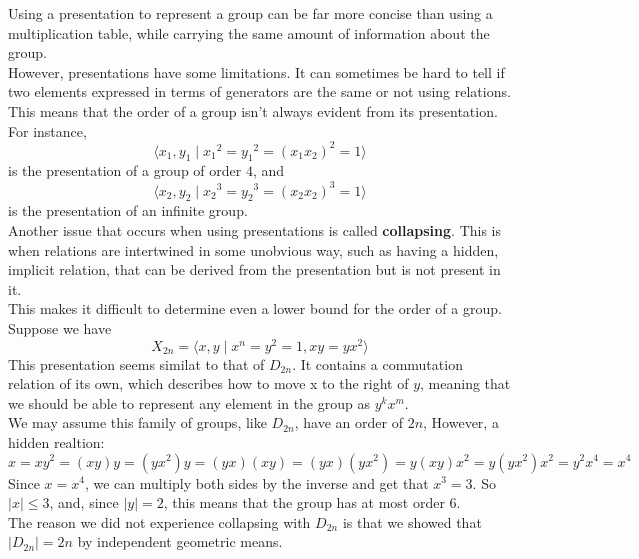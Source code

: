 \documentclass[12pt]{article}
\begin{document}
    Using a presentation to represent a group can be far more
    concise than using a multiplication table,
    while carrying the same amount of information about the group. \\
    However, presentations have some limitations.
    It can sometimes be hard to tell if two elements expressed
    in terms of generators are the same or not using relations.
    This means that the order of a group isn't always evident
    from its presentation.
    For instance,
    \[ \langle x_1, y_1 \mid {x_1}^2 = {y_1}^2 = (x_1x_2)^2 = 1 \rangle \]
    is the presentation of a group of order $4$,
    and
    \[ \langle x_2, y_2 \mid {x_2}^3 = {y_2}^3 = (x_2x_2)^3 = 1 \rangle \]
    is the presentation of an infinite group. \\
    
    Another issue that occurs when using presentations 
    is called \textbf{collapsing}.
    This is when relations are intertwined in some unobvious way,
    such as having a hidden, implicit relation,
    that can be derived from the presentation but is not present in it. \\
    This makes it difficult to determine even a lower bound
    for the order of a group. \\
    Suppose we have 
    \[ X_{2n} = \langle x, y \mid x^n = y^2 = 1, xy = yx^2 \rangle \]
    This presentation seems similat to that of $D_{2n}$.
    It contains a commutation relation of its own, 
    which describes how to move x to the right of $y$,
    meaning that we should be able to represent any element 
    in the group as $y^kx^{m}$. \\
    We may assume this family of groups, like $D_{2n}$,
    have an order of $2n$,
    However, a hidden realtion:
    \[ x = xy^2 = (xy)y  = (yx^2)y = (yx)(xy) = (yx)(yx^2)
    = y(xy)x^2 = y(yx^2)x^2 = y^2x^4 = x^4 \]
    Since $x = x^4$,
    we can multiply both sides by the inverse and get that $x^3 = 3$.
    So $|x| \leqslant 3$,
    and, 
    since $|y| = 2$,
    this means that the group has at most order $6$. \\

    The reason we did not experience collapsing with $D_{2n}$
    is that we showed that $|D_{2n}| = 2n$
    by independent geometric means. \\
\end{document}
